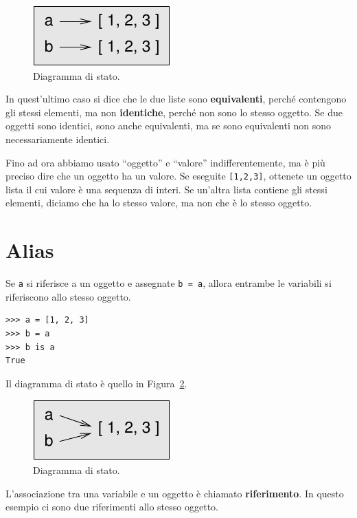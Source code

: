 \documentclass[10pt]{book}
\begin{document}
\begin{figure}
\centerline
{\includegraphics[scale=0.8]{figs/list2.pdf}}
\caption{Diagramma di stato.}
\label{fig.list2}
\end{figure}


In quest'ultimo caso si dice che le due liste sono {\bf equivalenti},
perché contengono gli stessi elementi, ma non {\bf identiche}, perché non sono lo stesso oggetto.
Se due oggetti sono identici, sono anche equivalenti, ma se sono equivalenti non sono necessariamente identici.

Fino ad ora abbiamo usato ``oggetto'' e ``valore'' indifferentemente, ma è più preciso dire che un oggetto ha un valore.  Se eseguite {\tt [1,2,3]}, ottenete un oggetto lista il cui valore è una sequenza di interi. Se un'altra lista contiene gli stessi elementi, diciamo che ha lo stesso valore, ma non che è lo stesso oggetto.


\section{Alias}

Se {\tt a} si riferisce a un oggetto e assegnate {\tt b = a},
allora entrambe le variabili si riferiscono allo stesso oggetto.

\begin{verbatim}
>>> a = [1, 2, 3]
>>> b = a
>>> b is a
True
\end{verbatim}
%
Il diagramma di stato è quello in Figura~\ref{fig.list3}.

\begin{figure}
\centerline
{\includegraphics[scale=0.8]{figs/list3.pdf}}
\caption{Diagramma di stato.}
\label{fig.list3}
\end{figure}

L'associazione tra una variabile e un oggetto è chiamato {\bf
riferimento}. In questo esempio ci sono due riferimenti allo stesso oggetto.
\end{document}
